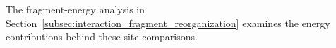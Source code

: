 %

The fragment-energy analysis in
Section~\ref{subsec:interaction_fragment_reorganization} examines the energy
contributions behind these site comparisons. 
